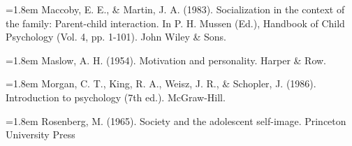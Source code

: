 \documentclass[12pt,oneside]{report}
\begin{document}
\noindent\hangindent=1.8em \textenglish{Maccoby, E. E., \& Martin, J. A. (1983). Socialization in the context of the family: Parent-child interaction. In P. H. Mussen (Ed.), Handbook of Child Psychology (Vol. 4, pp. 1-101). John Wiley \& Sons.}\par\vspace{3pt}
\noindent\hangindent=1.8em \textenglish{Maslow, A. H. (1954). Motivation and personality. Harper \& Row.}\par\vspace{3pt}
\noindent\hangindent=1.8em \textenglish{Morgan, C. T., King, R. A., Weisz, J. R., \& Schopler, J. (1986). Introduction to psychology (7th ed.). McGraw-Hill.}\par\vspace{3pt}
\noindent\hangindent=1.8em \textenglish{Rosenberg, M. (1965). Society and the adolescent self-image. Princeton University Press}\par\vspace{3pt}
\end{document}
